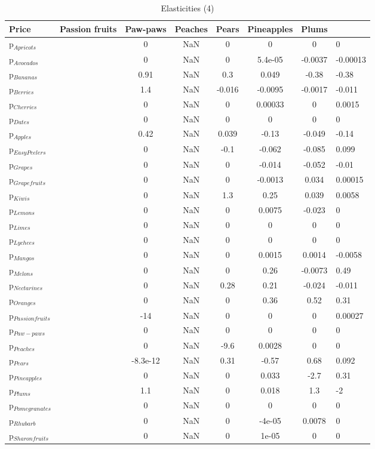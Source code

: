 \documentclass[11pt]{article}
\begin{document}
\begin{table}[h]
\caption{Elasticities (4)}
\label{Table: elasticities 4}
\begin{center}
\begin{tabular}{lcccccc} \hline \hline
Price &Passion fruits &Paw-paws &Peaches &Pears &Pineapples &Plums \\ \hline
p$_{Apricots}$ & &0 &NaN &0 &0 &0 &0 \\
p$_{Avocados}$ & &0 &NaN &0 &5.4e-05 &-0.0037 &-0.00013 \\
p$_{Bananas}$ & &0.91 &NaN &0.3 &0.049 &-0.38 &-0.38 \\
p$_{Berries}$ & &1.4 &NaN &-0.016 &-0.0095 &-0.0017 &-0.011 \\
p$_{Cherries}$ & &0 &NaN &0 &0.00033 &0 &0.0015 \\
p$_{Dates}$ & &0 &NaN &0 &0 &0 &0 \\
p$_{Apples}$ & &0.42 &NaN &0.039 &-0.13 &-0.049 &-0.14 \\
p$_{Easy Peelers}$ & &0 &NaN &-0.1 &-0.062 &-0.085 &0.099 \\
p$_{Grapes}$ & &0 &NaN &0 &-0.014 &-0.052 &-0.01 \\
p$_{Grapefruits}$ & &0 &NaN &0 &-0.0013 &0.034 &0.00015 \\
p$_{Kiwis}$ & &0 &NaN &1.3 &0.25 &0.039 &0.0058 \\
p$_{Lemons}$ & &0 &NaN &0 &0.0075 &-0.023 &0 \\
p$_{Limes}$ & &0 &NaN &0 &0 &0 &0 \\
p$_{Lychees}$ & &0 &NaN &0 &0 &0 &0 \\
p$_{Mangos}$ & &0 &NaN &0 &0.0015 &0.0014 &-0.0058 \\
p$_{Melons}$ & &0 &NaN &0 &0.26 &-0.0073 &0.49 \\
p$_{Nectarines}$ & &0 &NaN &0.28 &0.21 &-0.024 &-0.011 \\
p$_{Oranges}$ & &0 &NaN &0 &0.36 &0.52 &0.31 \\
p$_{Passion fruits}$ & &-14 &NaN &0 &0 &0 &0.00027 \\
p$_{Paw-paws}$ & &0 &NaN &0 &0 &0 &0 \\
p$_{Peaches}$ & &0 &NaN &-9.6 &0.0028 &0 &0 \\
p$_{Pears}$ & &-8.3e-12 &NaN &0.31 &-0.57 &0.68 &0.092 \\
p$_{Pineapples}$ & &0 &NaN &0 &0.033 &-2.7 &0.31 \\
p$_{Plums}$ & &1.1 &NaN &0 &0.018 &1.3 &-2 \\
p$_{Pomegranates}$ & &0 &NaN &0 &0 &0 &0 \\
p$_{Rhubarb}$ & &0 &NaN &0 &-4e-05 &0.0078 &0 \\
p$_{Sharon fruits}$ & &0 &NaN &0 &1e-05 &0 &0 \\
\end{tabular}
\end{center}
\end{table}
\end{document}
